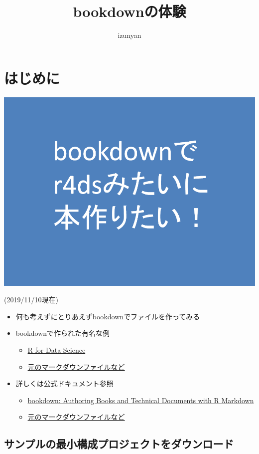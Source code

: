 \documentclass[xelatex, ja=standard, b5paper]{bxjsbook}
\title{bookdownの体験}
\author{izunyan}
\date{}
\providecommand{\tightlist}{%
  \setlength{\itemsep}{0pt}\setlength{\parskip}{0pt}}
\begin{document}
\maketitle

{
\setcounter{tocdepth}{1}
\tableofcontents
}
\hypertarget{hajime}{%
\chapter*{はじめに}\label{hajime}}

\includegraphics[width=0.6\linewidth]{images/cover}

(2019/11/10現在)

\begin{itemize}
\item
  何も考えずにとりあえずbookdownでファイルを作ってみる
\item
  bookdownで作られた有名な例

  \begin{itemize}
  \tightlist
  \item
    \href{https://r4ds.had.co.nz/}{R for Data Science}
  \item
    \href{https://github.com/hadley/r4ds}{元のマークダウンファイルなど}
  \end{itemize}
\item
  詳しくは公式ドキュメント参照

  \begin{itemize}
  \tightlist
  \item
    \href{https://bookdown.org/yihui/bookdown/}{bookdown: Authoring Books and Technical Documents with R Markdown}
  \item
    \href{https://github.com/rstudio/bookdown/tree/master/inst/examples}{元のマークダウンファイルなど}
  \end{itemize}
\end{itemize}

\hypertarget{hajime_dl}{%
\section*{サンプルの最小構成プロジェクトをダウンロード}\label{hajime_dl}}
\end{document}
